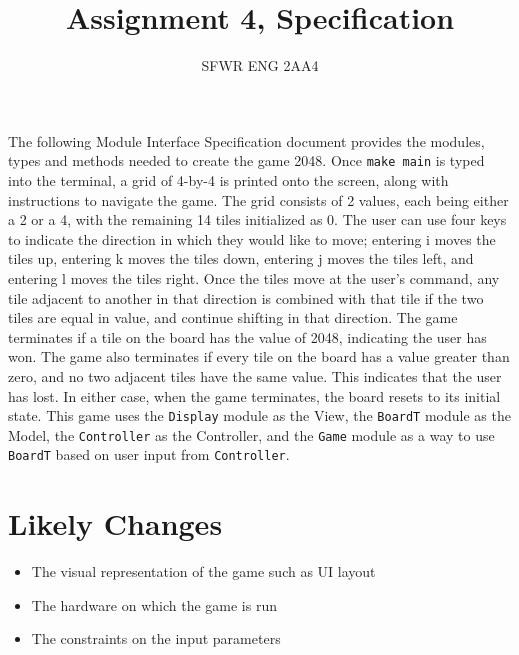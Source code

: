\documentclass[12pt]{article}
\title{Assignment 4, Specification}
\author{SFWR ENG 2AA4}
\begin{document}
\maketitle
The following Module Interface Specification document provides the modules, types and methods needed to create the game 2048. Once \verb|make main| is typed into the terminal, a grid of 4-by-4 is printed onto the screen, along with instructions to navigate the game. The grid consists of 2 values, each being either a 2 or a 4, with the remaining 14 tiles initialized as 0. The user can use four keys to indicate the direction in which they would like to move; entering i moves the tiles up, entering k moves  the tiles down, entering j moves the tiles left, and entering l moves the tiles right. Once the tiles move at the user’s command, any tile adjacent to another in that direction is combined with that tile if the two tiles are equal in value, and continue shifting in that direction. The game terminates if a tile on the board has the value of 2048, indicating the user has won. The game also terminates if every tile on the board has a value greater than zero, and no two adjacent tiles have the same value. This indicates that the user has lost. In either case, when the game terminates, the board resets to its initial state. This game uses the \verb|Display| module as the View, the \verb|BoardT| module as the Model, the \verb|Controller| as the Controller, and the \verb|Game| module as a way to use \verb|BoardT| based on user input from \verb|Controller|.

\section* {Likely Changes}
\begin{itemize}
  \item The visual representation of the game such as UI layout
  \item The hardware on which the game is run
  \item The constraints on the input parameters
\end{itemize} 


\end{document}
